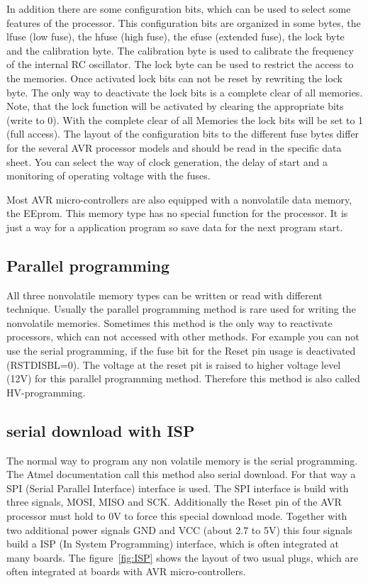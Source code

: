 In addition there are some configuration bits, which can be used to
select some features of the processor.
This configuration bits are organized in some bytes, the lfuse (low fuse),
the hfuse (high fuse), the efuse (extended fuse), the lock byte and the calibration byte.
The calibration byte is used to calibrate the frequency of the internal RC oscillator.
The lock byte can be used to restrict the access to the memories.
Once  activated lock bits can not be reset by rewriting the lock byte.
The only way to deactivate the lock bits is a complete clear of all memories.
Note, that the lock function will be activated by clearing the appropriate bits
(write to 0).
With the complete clear of all Memories the lock bits will be set to 1 (full access).
The layout of the configuration bits to the different fuse bytes differ for
the several AVR processor models and should be read in the specific data sheet.
You can select the way of clock generation, the delay of start and a
monitoring of operating voltage with the fuses.

Most AVR micro-controllers are also equipped with a nonvolatile data memory, the EEprom.
This memory type has no special function for the processor.
It is just a way for a application program so save data for the next
program start.


\subsection{Parallel programming}
All three nonvolatile memory types can be written or read with different technique.
Usually the parallel programming method is rare used for writing the nonvolatile memories.
Sometimes this method is the only way to reactivate processors, which can not
accessed with other methods.
For example you can not use the serial programming, if the fuse bit for the
Reset pin usage is deactivated (RSTDISBL=0).
The voltage at the reset pit is raised to higher voltage level (12V) for this parallel
programming method. Therefore this method is also called HV-programming.

\subsection{serial download with ISP}

The normal way to program any non volatile memory is the serial programming.
The Atmel documentation call this method also serial download.
For that way a SPI (Serial Parallel Interface) interface is used.
The SPI interface is build with three signals, MOSI, MISO and SCK.
Additionally the Reset pin of the AVR processor must hold to 0V to force
this special download mode.
Together with two additional power signals GND and VCC (about 2.7 to 5V) this
four signals build a ISP (In System Programming) interface, which is often
integrated at many boards.
The figure~\ref{fig:ISP} shows the layout of two usual plugs, which are
often integrated at boards with AVR micro-controllers.

